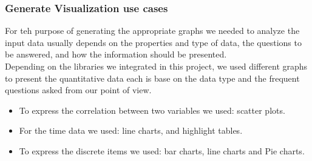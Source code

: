 \subsubsection*{Generate Visualization use cases}
For teh purpose of generating the appropriate graphs we needed to analyze the input data usually depends on the properties and type of data, the questions to be answered, and how the information should be presented.\\
Depending on the libraries we integrated in this project, we used different graphs to present the quantitative data each is base on the data type and the frequent questions asked from our point of view.
\begin{itemize}
  \renewcommand{\labelitemi}{$\bullet$}
  \item To express the correlation between two variables we used: scatter plots.
  \item For the time data we used: line charts, and highlight tables.
  \item To express the discrete items we used:  bar charts, line charts and Pie charts.
\end{itemize}

